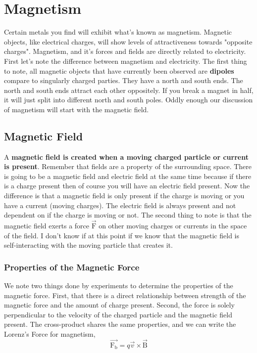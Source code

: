 \chapter{Magnetism}
Certain metals you find will exhibit what's known as magnetism. Magnetic objects, like electrical charges, will show levels of attractiveness towards "opposite charges". Magnetism, and it's forces and fields are directly related to electricity. First let's note the difference between magnetism and electricity. The first thing to note, all magnetic objects that have currently been observed are \textbf{dipoles} compare to singularly charged parties. They have a north and south ends. The north and south ends attract each other oppositely. If you break a magnet in half, it will just split into different north and south poles. Oddly enough our discussion of magnetism will start with the magnetic field.

\section{Magnetic Field}
A \textbf{magnetic field is created when a moving charged particle or current is present}. Remember that fields are a property of the surrounding space. There is going to be a magnetic field and electric field at the same time because if there is a charge present then of course you will have an electric field present. Now the difference is that a magnetic field is only present if the charge is moving or you have a current (moving charges). The electric field is always present and not dependent on if the charge is moving or not. The second thing to note is that the magnetic field exerts a force $\vec{\mathrm{F}}$ on other moving charges or currents in the space of the field. I don't know if at this point if we know that the magnetic field is self-interacting with the moving particle that creates it. 

\subsection{Properties of the Magnetic Force}
We note two things done by experiments to determine the properties of the magnetic force. First, that there is a direct relationship between strength of the magnetic force and the amount of charge present. Second, the force is solely perpendicular to the velocity of the charged particle and the magnetic field present. The cross-product shares the same properties, and we can write the Lorenz's Force for magnetism,
\begin{equation*}
	\vec{\mathrm{F_b}} = q\vec{v} \times \vec{\mathrm{{B}}} 
\end{equation*}

